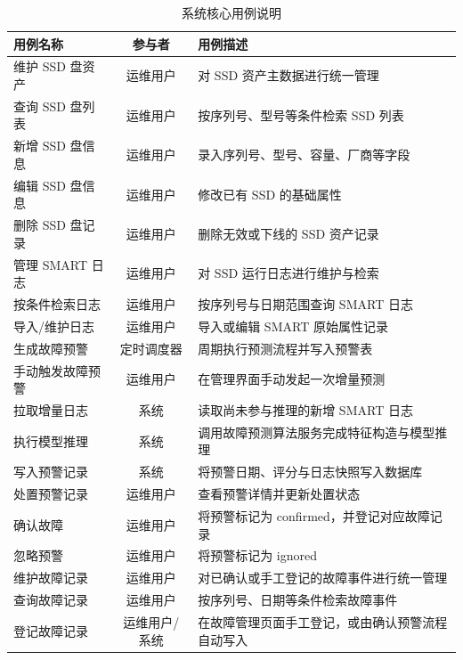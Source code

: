 {    \begin{table}[H]
        \centering
        \caption{\label{tab:sw-usecase}系统核心用例说明}
        \setlength{\tabcolsep}{4pt}
        \begin{tabularx}{\linewidth}{@{}l c X@{}}
            \toprule
            用例名称 & 参与者 & 用例描述 \\
            \midrule
            维护 SSD 盘资产 & 运维用户 & 对 SSD 资产主数据进行统一管理 \\
            查询 SSD 盘列表 & 运维用户 & 按序列号、型号等条件检索 SSD 列表 \\
            新增 SSD 盘信息 & 运维用户 & 录入序列号、型号、容量、厂商等字段 \\
            编辑 SSD 盘信息 & 运维用户 & 修改已有 SSD 的基础属性 \\
            删除 SSD 盘记录 & 运维用户 & 删除无效或下线的 SSD 资产记录 \\
            管理 SMART 日志 & 运维用户 & 对 SSD 运行日志进行维护与检索 \\
            按条件检索日志 & 运维用户 & 按序列号与日期范围查询 SMART 日志 \\
            导入/维护日志 & 运维用户 & 导入或编辑 SMART 原始属性记录 \\
            生成故障预警 & 定时调度器 & 周期执行预测流程并写入预警表 \\
            手动触发故障预警 & 运维用户 & 在管理界面手动发起一次增量预测 \\
            拉取增量日志 & 系统 & 读取尚未参与推理的新增 SMART 日志 \\
            执行模型推理 & 系统 & 调用故障预测算法服务完成特征构造与模型推理 \\
            写入预警记录 & 系统 & 将预警日期、评分与日志快照写入数据库 \\
            处置预警记录 & 运维用户 & 查看预警详情并更新处置状态 \\
            确认故障 & 运维用户 & 将预警标记为 confirmed，并登记对应故障记录 \\
            忽略预警 & 运维用户 & 将预警标记为 ignored \\
            维护故障记录 & 运维用户 & 对已确认或手工登记的故障事件进行统一管理 \\
            查询故障记录 & 运维用户 & 按序列号、日期等条件检索故障事件 \\
            登记故障记录 & 运维用户/系统 & 在故障管理页面手工登记，或由确认预警流程自动写入 \\
            \bottomrule
        \end{tabularx}
    \end{table}

}
